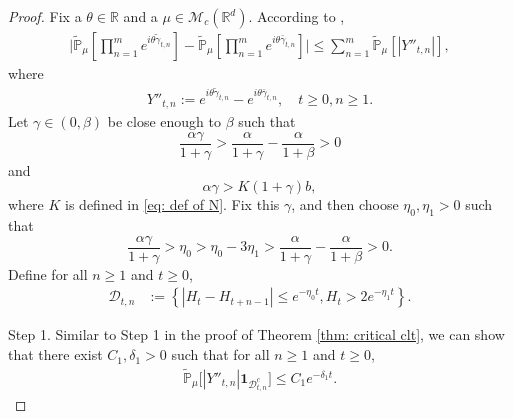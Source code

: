 \documentclass[12pt,a4paper]{amsart}
\theoremstyle{plain}
\theoremstyle{definition}
\numberwithin{equation}{section}
\begin{document}
\begin{proof}
    Fix a $\theta \in \mathbb R$ and a $\mu \in \mathcal M_c(\mathbb R^d)$.
    According to \cite[Lemma 3.4.3]{Durrett2010Probability},
\begin{align}\label{ineq: used next 3}
    \Big|\widetilde{\mathbb{P}}_{\mu}[\prod_{n=1}^me^{i\theta \widetilde{\gamma}_{t,n}}]-\widetilde{\mathbb{P}}_{\mu}[\prod_{n=1}^me^{i\theta \bar{\gamma}_{t,n}}]\Big|\leq \sum_{n=1}^m\widetilde{\mathbb{P}}_{\mu}[|Y''_{t,n}|],
\end{align}
    where
\begin{align}
    Y''_{t,n}
    :=e^{i\theta\widetilde{\gamma}_{t,n}}-e^{i\theta\bar{\gamma}_{t,n}},
    \quad t\geq 0, n\geq 1.
\end{align}
    Let $\gamma \in (0,\beta)$ be close enough to $\beta$ such that
\[
    \frac{\alpha \gamma}{1+\gamma}
    > \frac{\alpha}{1+\gamma} - \frac{\alpha}{1+\beta} > 0
\]
    and
\[
    \alpha\gamma
    >K(1+\gamma)b,
\]
		where $K$ is defined in \eqref{eq: def of N}.
    Fix this $\gamma$, and then choose $\eta_0,\eta_1>0$ such that
\[
    \frac{\alpha \gamma}{1+\gamma}
    > \eta_0
    > \eta_0 - 3\eta_1
    > \frac{\alpha}{1+\gamma} - \frac{\alpha}{1+\beta}
    > 0.
\]
    Define for all $n \geq 1$ and $t\geq 0$,
\begin{align}
\label{def: Dtk1}
    \mathcal{D}_{t,n}
    &:=\left\{|H_t-H_{t+n-1}|\leq  e^{-\eta_0 t}, H_{t}> 2e^{-\eta_1t}\right\}.
\end{align}

    Step 1. Similar to Step 1 in the proof of Theorem \ref{thm: critical clt}, we can show that there exist $C_1,\delta_1 >0$ such that for all $n \geq 1$ and $t\geq 0$,
\begin{align}
\label{thm12111}
    \mathbb{\widetilde{P}}_{\mu}\big[|Y''_{t,n}|\mathbf{1}_{\mathcal{D}^c_{t,n}}\big]
    \leq C_1 e^{-\delta_1 t}.
\end{align}



\end{proof}
\end{document}
